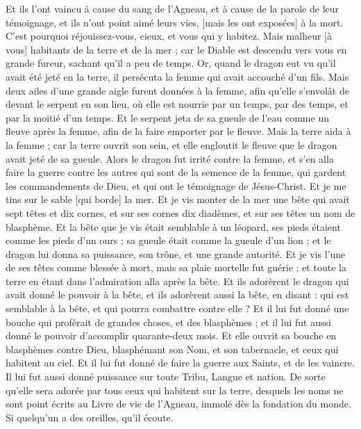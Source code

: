 \begin{multicols}{2}
Et ils l'ont vaincu à cause du sang de l'Agneau, et à cause de la parole de leur témoignage, et ils n'ont point aimé leurs vies, [mais les ont exposées] à la mort.
C'est pourquoi réjouissez-vous, cieux, et vous qui y habitez. Mais malheur [à vous] habitants de la terre et de la mer ; car le Diable est descendu vers vous en grande fureur, sachant qu'il a peu de temps.
Or, quand le dragon eut vu qu'il avait été jeté en la terre, il persécuta la femme qui avait accouché d'un fils.
Mais deux ailes d'une grande aigle furent données à la femme, afin qu'elle s'envolât de devant le serpent en son lieu, où elle est nourrie par un temps, par des temps, et par la moitié d'un temps.
Et le serpent jeta de sa gueule de l'eau comme un fleuve après la femme, afin de la faire emporter par le fleuve.
Mais la terre aida à la femme ; car la terre ouvrit son sein, et elle engloutit le fleuve que le dragon avait jeté de sa gueule.
Alors le dragon fut irrité contre la femme, et s'en alla faire la guerre contre les autres qui sont de la semence de la femme, qui gardent les commandements de Dieu, et qui ont le témoignage de Jésus-Christ.
Et je me tins sur le sable [qui borde] la mer.
\VerseOne{}Et je vis monter de la mer une bête qui avait sept têtes et dix cornes, et sur ses cornes dix diadèmes, et sur ses têtes un nom de blasphème.
Et la bête que je vis était semblable à un léopard, ses pieds étaient comme les pieds d'un ours ; sa gueule était comme la gueule d'un lion ; et le dragon lui donna sa puissance, son trône, et une grande autorité.
Et je vis l'une de ses têtes comme blessée à mort, mais sa plaie mortelle fut guérie ; et toute la terre en étant dans l'admiration alla après la bête.
Et ils adorèrent le dragon qui avait donné le pouvoir à la bête, et ils adorèrent aussi la bête, en disant : qui est semblable à la bête, et qui pourra combattre contre elle ?
Et il lui fut donné une bouche qui proférait de grandes choses, et des blasphèmes ; et il lui fut aussi donné le pouvoir d'accomplir quarante-deux mois.
Et elle ouvrit sa bouche en blasphèmes contre Dieu, blasphémant son Nom, et son tabernacle, et ceux qui habitent au ciel.
Et il lui fut donné de faire la guerre aux Saints, et de les vaincre. Il lui fut aussi donné puissance sur toute Tribu, Langue et nation.
De sorte qu'elle sera adorée par tous ceux qui habitent sur la terre, desquels les noms ne sont point écrits au Livre de vie de l'Agneau, immolé dès la fondation du monde.
Si quelqu'un a des oreilles, qu'il écoute.

\end{multicols}
